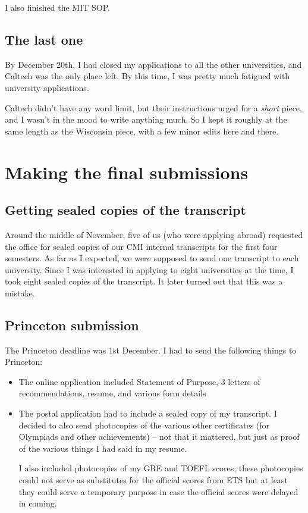 \documentclass[a4paper]{amsart}
\begin{document}
I also finished the MIT SOP.

\subsection{The last one}

By December 20th, I had closed my applications to all the other universities,
and Caltech was the only place left. By this time, I was pretty much fatigued
with university applications.

Caltech didn't have any word limit, but their instructions urged for a
{\em short} piece, and I wasn't in the mood to write anything much. So I kept
it roughly at the same length as the Wisconsin piece, with a few minor edits
here and there.

\section{Making the final submissions}

\subsection{Getting sealed copies of the transcript}

Around the middle of November, five of us (who were applying abroad)
requested the office for sealed copies of our CMI internal transcripts
for the first four semesters. As far as I expected, we were supposed
to send one transcript to each university. Since I was interested
in applying to eight universities at the time, I took eight sealed copies
of the transcript. It later turned out that this was a mistake.

\subsection{Princeton submission}

The Princeton deadline was 1st December. I had to send the following things
to Princeton:

\begin{itemize}

\item The online application included Statement of Purpose, 3 letters
  of recommendations, resume, and various form details

\item The postal application had to include a sealed copy of my transcript.
  I decided to also send photocopies of the various other certificates
  (for Olympiads and other achievements) -- not that it mattered, but just
  as proof of the various things I had said in my resume.

  I also included photocopies of my GRE and TOEFL scores; these photocopies
  could not serve as substitutes for the official scores from ETS but
  at least they could serve a temporary purpose in case the official scores
  were delayed in coming.
\end{itemize}
\end{document}

